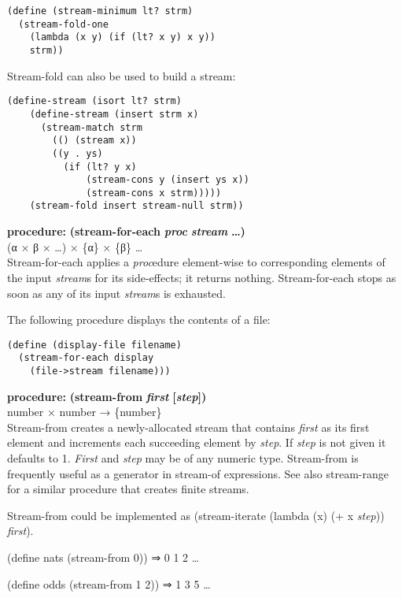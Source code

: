 \begin{verbatim}
(define (stream-minimum lt? strm)
  (stream-fold-one
    (lambda (x y) (if (lt? x y) x y))
    strm))
\end{verbatim}

Stream-fold can also be used to build a stream:

\begin{verbatim}
(define-stream (isort lt? strm)
    (define-stream (insert strm x)
      (stream-match strm
        (() (stream x))
        ((y . ys)
          (if (lt? y x)
              (stream-cons y (insert ys x))
              (stream-cons x strm)))))
    (stream-fold insert stream-null strm))
\end{verbatim}

\textbf{procedure:} \textbf{(stream-for-each} \textbf{\emph{proc}}
\textbf{} \textbf{\emph{stream}} \textbf{\ldots{})}\\
(α × β × \ldots{}) × \{α\} × \{β\} \ldots{}\\
Stream-for-each applies a \emph{proc}edure element-wise to corresponding
elements of the input \emph{stream}s for its side-effects; it returns
nothing. Stream-for-each stops as soon as any of its input
\emph{stream}s is exhausted.

The following procedure displays the contents of a file:

\begin{verbatim}
(define (display-file filename)
  (stream-for-each display
    (file->stream filename)))
\end{verbatim}

\textbf{procedure:} \textbf{(stream-from} \textbf{\emph{first}}
\textbf{{[}\emph{step}{]})}\\
number × number → \{number\}\\
Stream-from creates a newly-allocated stream that contains \emph{first}
as its first element and increments each succeeding element by
\emph{step}. If \emph{step} is not given it defaults to 1. \emph{First}
and \emph{step} may be of any numeric type. Stream-from is frequently
useful as a generator in stream-of expressions. See also stream-range
for a similar procedure that creates finite streams.

Stream-from could be implemented as (stream-iterate (lambda (x) (+ x
\emph{step})) \emph{first}).

(define nats (stream-from 0)) ⇒ 0 1 2 \ldots{}

(define odds (stream-from 1 2)) ⇒ 1 3 5 \ldots{}

